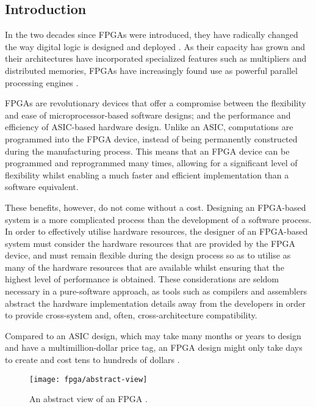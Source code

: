 \subsection{Introduction}
\label{fpga:introduction}
In the two decades since \glspl{FPGA} were introduced, they have radically
changed the way digital logic is designed and deployed \cite{Hauck:2007}. As
their capacity has grown and their architectures have incorporated specialized
features such as multipliers and distributed memories, \glspl{FPGA} have
increasingly found use as powerful parallel processing engines
\cite{Berkeley:2010}.

\glspl{FPGA} are revolutionary devices that offer a compromise between the
flexibility and ease of microprocessor-based software designs; and the
performance and efficiency of \gls{ASIC}-based hardware design. Unlike an
\gls{ASIC}, computations are programmed into the \gls{FPGA} device, instead of
being permanently constructed during the manufacturing process. This means that
an \gls{FPGA} device can be programmed and reprogrammed many times, allowing for
a significant level of flexibility whilst enabling a much faster and efficient
implementation than a software equivalent.

These benefits, however, do not come without a cost. Designing an
\gls{FPGA}-based system is a more complicated process than the development of a
software process. In order to effectively utilise hardware resources, the
designer of an \gls{FPGA}-based system must consider the hardware resources that
are provided by the \gls{FPGA} device, and must remain flexible during the
design process so as to utilise as many of the hardware resources that are
available whilst ensuring that the highest level of performance is obtained.
These considerations are seldom necessary in a pure-software approach, as tools
such as compilers and assemblers abstract the hardware implementation details
away from the developers in order to provide cross-system and, often,
cross-architecture compatibility.

Compared to an \gls{ASIC} design, which may take many months or years to design
and have a multimillion-dollar price tag, an \gls{FPGA} design might only take
days to create and cost tens to hundreds of dollars \cite{Hauck:2007}.

\begin{figure}
    \centering
    \texttt{[image: fpga/abstract-view]}
    \caption[An abstract view of an \gls{FPGA}.]
        {An abstract view of an \gls{FPGA} \cite{Hauck:2007}.}
    \label{fig:fpga:abstract}
\end{figure}

